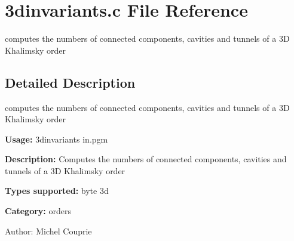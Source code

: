 \section{3dinvariants.c File Reference}
\label{3dinvariants_8c}
computes the numbers of connected components, cavities and tunnels of a 3D Khalimsky order 



\subsection{Detailed Description}
computes the numbers of connected components, cavities and tunnels of a 3D Khalimsky order 

{\bf Usage:} 3dinvariants in.pgm

{\bf Description:} Computes the numbers of connected components, cavities and tunnels of a 3D Khalimsky order

{\bf Types supported:} byte 3d

{\bf Category:} orders

\begin{Desc}
\item[Author:]Michel Couprie \end{Desc}
